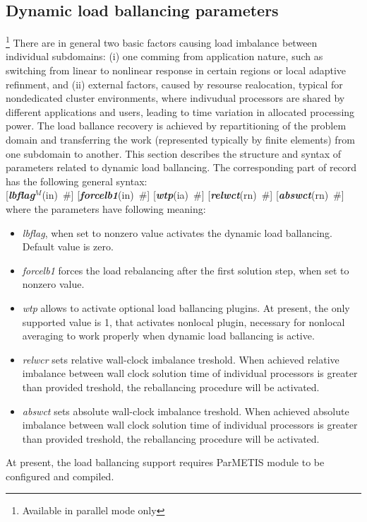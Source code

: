 \documentclass[draft]{article}
\newcommand{\param}[1]{{\em #1}}
\newcommand{\keywordnotype}[1]{\mbox{{\it{\bf{#1}}}}}
\newcommand{\keyword}[2]{\mbox{{\keywordnotype{#1}\tiny (#2)}}}
\newcommand{\field}[2]{\mbox{\keyword{#1}{#2}~\#}}
\newcommand{\optField}[2]{\mbox{[\field{#1}{#2}]}}
\newcommand{\Pmode}[1]{{\sffamily #1}}
\begin{document}
\subsection{\Pmode{Dynamic load ballancing parameters}}\footnote{Available in parallel mode only}
\label{dynamicloadballancing}
There are in general two basic factors causing load imbalance between individual subdomains: (i) one comming from application nature, such as switching from linear to nonlinear response in certain regions or local adaptive refinment, and (ii) external factors, caused by resourse realocation, typical for nondedicated cluster environments, where indivudual processors are shared by different applications and users, leading to time variation in allocated processing power. The load ballance recovery is achieved by repartitioning of the problem domain and transferring the work (represented typically by finite elements) from one subdomain to another.
This section describes the structure and syntax of parameters related to dynamic load ballancing. 
The corresponding part of record has the following general syntax:\\
\optField{lbflag$^M$}{in} \optField{forcelb1}{in} \optField{wtp}{ia} \optField{relwct}{rn} \optField{abswct}{rn}\\
where the parameters have following meaning:
\begin{itemize}
\item \param{lbflag}, when set to nonzero value activates the dynamic load ballancing. Default value is zero.
\item \param{forcelb1} forces the load rebalancing after the first solution step, when set to nonzero value.
\item \param{wtp} allows to activate optional load ballancing plugins. At present, the only supported value is 1, that activates nonlocal plugin, necessary for nonlocal averaging to work properly when dynamic load ballancing is active.
\item \param{relwcr} sets relative wall-clock imbalance treshold. When achieved relative imbalance between wall clock solution time of individual processors is greater than provided treshold, the reballancing procedure will be activated.
\item \param{abswct} sets absolute wall-clock imbalance treshold. When achieved absolute imbalance between wall clock solution time of individual processors is greater than provided treshold, the reballancing procedure will be activated.
\end{itemize}
At present, the load ballancing support requires ParMETIS module to be configured and compiled.
\end{document}
